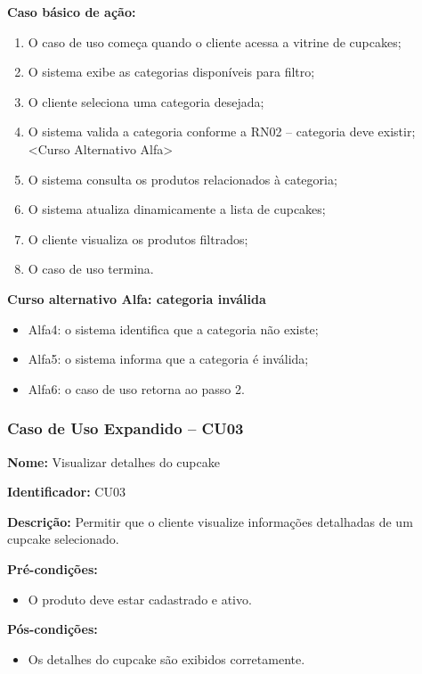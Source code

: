 \documentclass[12pt]{article}
\begin{document}
\textbf{Caso básico de ação:}
\begin{enumerate}
\item O caso de uso começa quando o cliente acessa a vitrine de cupcakes;
\item O sistema exibe as categorias disponíveis para filtro;
\item O cliente seleciona uma categoria desejada;
\item O sistema valida a categoria conforme a RN02 -- categoria deve existir; <Curso Alternativo Alfa>
\item O sistema consulta os produtos relacionados à categoria;
\item O sistema atualiza dinamicamente a lista de cupcakes;
\item O cliente visualiza os produtos filtrados;
\item O caso de uso termina.
\end{enumerate}

\textbf{Curso alternativo Alfa: categoria inválida}

\begin{itemize}
\item Alfa4: o sistema identifica que a categoria não existe;
\item Alfa5: o sistema informa que a categoria é inválida;
\item Alfa6: o caso de uso retorna ao passo 2.
\end{itemize}


\subsubsection{Caso de Uso Expandido -- CU03}

\textbf{Nome:} Visualizar detalhes do cupcake

\textbf{Identificador:} CU03

\textbf{Descrição:} Permitir que o cliente visualize informações detalhadas de um cupcake selecionado.

\textbf{Pré-condições:}
\begin{itemize}
\item O produto deve estar cadastrado e ativo.
\end{itemize}

\textbf{Pós-condições:}
\begin{itemize}
\item Os detalhes do cupcake são exibidos corretamente.
\end{itemize}
\end{document}

